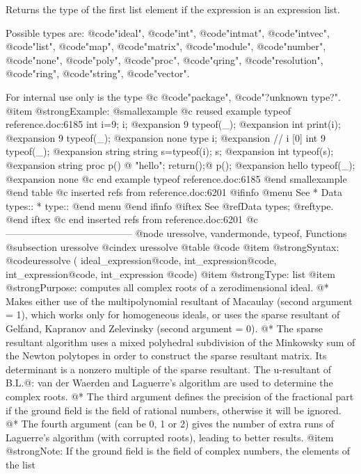 {{{{{{{Returns the type of the first list element if the expression is an
expression list.

Possible types are:
@code{"ideal"},
@code{"int"},
@code{"intmat"},
@code{"intvec"},
@code{"list"},
@code{"map"},
@code{"matrix"},
@code{"module"},
@code{"number"},
@code{"none"},
@code{"poly"},
@code{"proc"},
@code{"qring"},
@code{"resolution"},
@code{"ring"},
@code{"string"},
@code{"vector"}.

For internal use only is the type
@c @code{"package"},
@code{"?unknown type?"}.
@item @strong{Example:}
@smallexample
@c reused example typeof reference.doc:6185 
  int i=9; i;
@expansion{} 9
  typeof(_);
@expansion{} int
  print(i);
@expansion{} 9
  typeof(_);
@expansion{} none
  type i;
@expansion{} // i                    [0]  int 9
  typeof(_);
@expansion{} string
  string s=typeof(i);
  s;
@expansion{} int
  typeof(s);
@expansion{} string
  proc p() @{  "hello"; return();@}
  p();
@expansion{} hello
  typeof(_);
@expansion{} none
@c end example typeof reference.doc:6185
@end smallexample
@end table
@c inserted refs from reference.doc:6201
@ifinfo
@menu
See
* Data types::
* type::
@end menu
@end ifinfo
@iftex
See
@ref{Data types};
@ref{type}.
@end iftex
@c end inserted refs from reference.doc:6201
@c ---------------------------------------
@node uressolve, vandermonde, typeof, Functions
@subsection uressolve
@cindex uressolve
@table @code
@item @strong{Syntax:}
@code{uressolve (} ideal_expression@code{,} int_expression@code{,} int_expression@code{,} int_expression @code{)}
@item @strong{Type:}
list
@item @strong{Purpose:}
computes all complex roots of a zerodimensional ideal. @*
Makes either use of the multipolynomial resultant of Macaulay (second argument
= 1), which works only for homogeneous ideals, or uses the sparse resultant
of Gelfand, Kapranov and Zelevinsky (second argument = 0). @*
The sparse resultant algorithm uses a mixed polyhedral subdivision of the
Minkowsky sum of the Newton polytopes in order to construct the sparse
resultant matrix. Its determinant is a nonzero multiple of the sparse
resultant. The u-resultant of B.L.@: van der Waerden and Laguerre's algorithm
are used to determine the complex roots. @*
The third argument defines the precision of the fractional part if the ground
field is the field of rational numbers, otherwise it will be ignored. @*
The fourth argument (can be 0, 1 or 2) gives the number of extra runs of
Laguerre's algorithm (with corrupted roots), leading to better results.
@item @strong{Note:}
If the ground field is the field of complex numbers, the elements of the list
}}}}}}}
